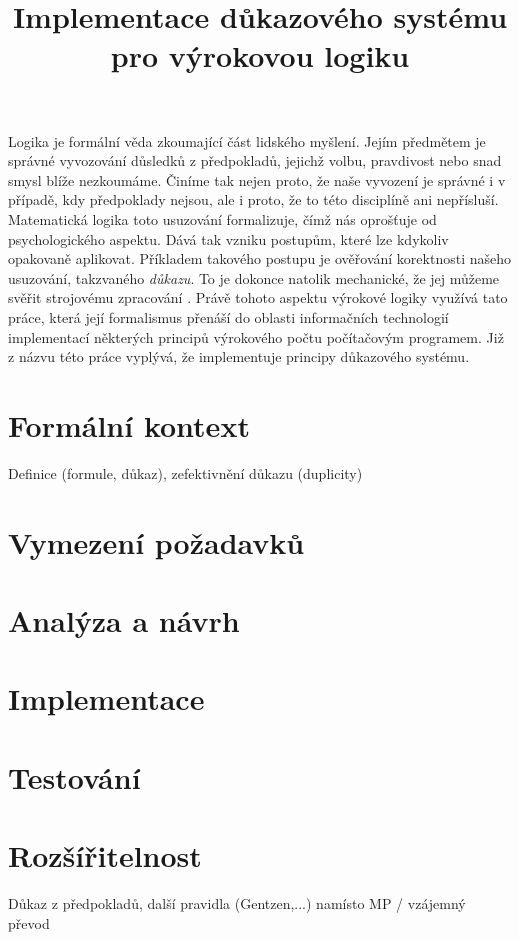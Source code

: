 \documentclass[thesis=B,czech]{FITthesis}[2012/06/26]
\title{Implementace důkazového systému pro výrokovou logiku}
\begin{document}

\begin{introduction}
Logika je formální věda zkoumající část lidského myšlení. Jejím předmětem je správné vyvozování důsledků z předpokladů, jejichž volbu, pravdivost nebo snad smysl blíže nezkoumáme. Činíme tak nejen proto, že naše vyvození je správné i v případě, kdy předpoklady nejsou, ale i proto, že to této disciplíně ani nepřísluší. Matematická logika toto usuzování formalizuje, čímž nás oprošťuje od psychologického aspektu. Dává tak vzniku postupům, které lze kdykoliv opakovaně aplikovat. Příkladem takového postupu je ověřování korektnosti našeho usuzování, takzvaného \emph{důkazu}. To je dokonce natolik mechanické, že jej můžeme svěřit strojovému zpracování \cite{kml}. Právě tohoto aspektu výrokové logiky využívá tato práce, která její formalismus přenáší do oblasti informačních technologií implementací některých principů výrokového počtu počítačovým programem. Již z názvu této práce vyplývá, že implementuje principy důkazového systému.
\end{introduction}

\chapter{Formální kontext}
Definice (formule, důkaz), zefektivnění důkazu (duplicity)

\chapter{Vymezení požadavků}

\chapter{Analýza a návrh}

\chapter{Implementace}

\chapter{Testování}

\chapter{Rozšířitelnost}
Důkaz z předpokladů, další pravidla (Gentzen,...) namísto MP / vzájemný převod
\end{document}
